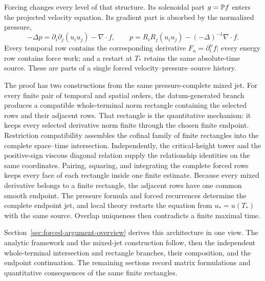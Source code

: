 Forcing changes every level of that structure. Its solenoidal part
\(g=\mathbb P f\) enters the projected velocity equation. Its gradient part is
absorbed by the normalized pressure,
\[
 -\Delta p=\partial_i\partial_j(u_i u_j)-\nabla\cdot f,
 \qquad
 p=R_iR_j(u_i u_j)-(-\Delta)^{-1}\nabla\cdot f.
\]
Every temporal row contains the corresponding derivative
\(F_n=\partial_t^nf\); every energy row contains force work; and a restart at
\(T_*\) retains the same absolute-time source. These are parts of a single
forced velocity--pressure--source history.

The proof has two constructions from the same pressure-complete mixed jet.
For every finite pair of temporal and spatial orders, the datum-generated
branch produces a compatible whole-terminal norm rectangle containing the
selected rows and their adjacent rows.  That rectangle is the quantitative
mechanism: it keeps every selected derivative norm finite through the chosen
finite endpoint.  Restriction compatibility assembles the cofinal family of
finite rectangles into the complete space--time intersection.  Independently,
the critical-height tower and the positive-sign viscous diagonal relation
supply the relationship identities on the same coordinates.  Pairing,
squaring, and integrating the complete forced rows keeps every face of each
rectangle inside one finite estimate.  Because every mixed derivative belongs
to a finite rectangle, the adjacent rows have one common smooth endpoint.
The pressure formula and forced recurrences determine
the complete endpoint jet, and local theory restarts the equation from
\(u_*=u(T_*)\) with the same source. Overlap uniqueness then contradicts a
finite maximal time.

Section~\ref{sec:forced-argument-overview} derives this architecture in one
view. The analytic framework and the mixed-jet construction follow, then the
independent whole-terminal intersection and rectangle branches, their
composition, and the endpoint
continuation. The remaining
sections record matrix formulations and quantitative consequences of the same
finite rectangles.
